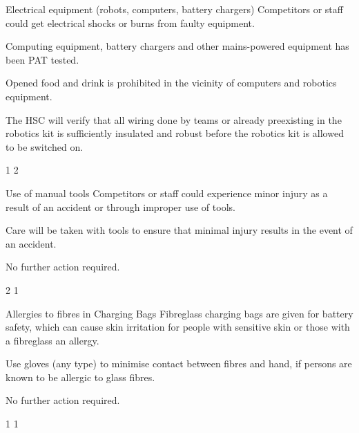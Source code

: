 {    \risk
        {Electrical equipment (robots, computers, battery chargers)}
        {Competitors or staff could get electrical shocks or burns from faulty
         equipment.}
        {\item Computing equipment, battery chargers and other mains-powered
         equipment has been PAT tested.
         \item Opened food and drink is prohibited in the vicinity of
         computers and robotics equipment.}
        {\item The HSC will verify that all wiring done by teams or already
         preexisting in the robotics kit is sufficiently insulated and robust
         before the robotics kit is allowed to be switched on.}
        {1} %
        {2} %

    \risk
        {Use of manual tools}
        {Competitors or staff could experience minor injury as a result of an
         accident or through improper use of tools.}
        {\item Care will be taken with tools to ensure that minimal injury
         results in the event of an accident.}
        {\item No further action required.}
        {2} %
        {1} %

    \risk
        {Allergies to fibres in Charging Bags}
        {Fibreglass charging bags are given for battery safety, which can
        cause skin irritation for people with sensitive skin or those with a
        fibreglass an allergy.}
        {\item Use gloves (any type) to minimise contact between fibres and hand, if persons
are known to be allergic to glass fibres.}
        {\item No further action required.}
        {1} %
        {1} %

}


\newcommand{\postrisks}{
    \subsection*{Risk of fire}

    To minimise the risk of fire resulting from this activity, food and drink
    will not be allowed near electrical equipment, and naked flames will be
    prohibited. The risk of fire occurring elsewhere in the building(s) is
    controlled primarily by the building operator.
    The HSC will ensure that all people present are informed of the
    locations of the exits and whether any fire drills are expected to take
    place. Should a fire break out (or any other event requiring evacuation),
    all people are to evacuate through the nearest accessible exit.
}



